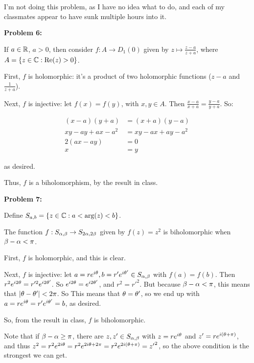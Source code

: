 \documentclass[a4paper,12pt]{article}
\begin{document}
I'm not doing this problem, as I have no idea what to do, and each of my classmates appear to have sunk multiple hours into it.

\shunt

{\bf Problem 6:}

If $a \in \mathbb{R}$, $a>0$, then consider $f: A \to D_1(0)$ given by $ z \mapsto \frac{z-a}{z+a}$, where $A = \{z \in \mathbb{C}: \text{Re}(z) >0\}$.

First, $f$ is holomorphic: it's a product of two holomorphic functions ($z-a$ and $\frac{1}{z+a}$).

Next, $f$ is injective: let $f(x)=f(y)$, with $x,y \in A$. Then $\frac{x-a}{x+a} = \frac{y-a}{y+a}$. So:

\begin{align*}
(x-a)(y+a) &= (x+a)(y-a) \\
xy -ay +ax -a^2 &= xy -ax + ay - a^2 \\
2(ax-ay) &= 0\\
x&=y
\end{align*}

as desired.

Thus, $f$ is a biholomorphism, by the result in class.

\shunt

{\bf Problem 7:}

Define $S_{a,b} = \{z \in \mathbb{C}: a< \text{arg}(z) < b\}$.

The function $f: S_{\alpha,\beta} \to S_{2\alpha,2\beta}$ given by $f(z) = z^2$ is biholomorphic when $\beta-\alpha < \pi$.

First, $f$ is holomorphic, and this is clear.

Next, $f$ is injective: let $a=re^{i\theta}, b=r'e^{i\theta'} \in S_{\alpha,\beta}$ with $f(a)=f(b)$. Then $r^2e^{i2\theta}=r'^2e^{i2\theta'}$. So $e^{i2\theta} = e^{i2\theta'}$, and $r^2 = r'^2$. But because $\beta-\alpha < \pi$, this means that $\left\lvert \theta-\theta' \right\rvert < 2\pi$. So This means that $\theta = \theta'$, so we end up with $a=re^{i\theta}=r'e^{i\theta'}=b$, as desired.

So, from the result in class, $f$ is biholomorphic.

Note that if $\beta-\alpha \geq \pi$, there are $z,z' \in S_{\alpha,\beta}$ with $z=re^{i\theta}$ and $z' = re^{i(\theta + \pi)}$, and thus $z^2 = r^2e^{2i\theta} = r^2e^{2i\theta + 2\pi} = r^2e^{2i(\theta + \pi)} = {z'}^2$, so the above condition is the strongest we can get.

\shunt
\end{document}
